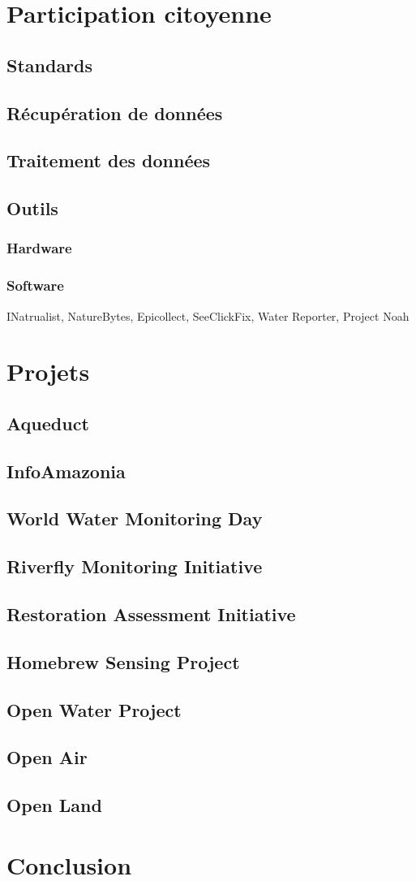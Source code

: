 \documentclass[a4paper,11pt,titlepage]{article}
\begin{document}
	\section{Participation citoyenne}
		\subsection{Standards}
		\subsection{Récupération de données}
		\subsection{Traitement des données}
		\subsection{Outils}
			\subsubsection{Hardware}
			\subsubsection{Software}
				INatrualist, NatureBytes, Epicollect, SeeClickFix, Water Reporter, Project Noah	
			
	\section{Projets}
		\subsection{Aqueduct}
		\subsection{InfoAmazonia}
		\subsection{World Water Monitoring Day}
		\subsection{Riverfly Monitoring Initiative}
		\subsection{Restoration Assessment Initiative}
		\subsection{Homebrew Sensing Project}
		\subsection{Open Water Project}
		\subsection{Open Air}
		\subsection{Open Land}
	
	\section{Conclusion}
	\newpage
	
	
	
\end{document}
